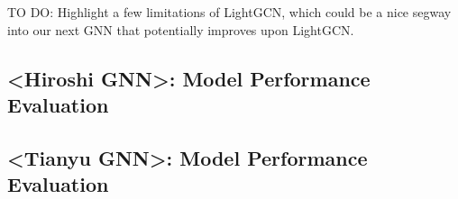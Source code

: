 \documentclass{article}
\begin{document}
 TO DO: Highlight a few limitations of LightGCN, which could be a nice segway into our next GNN that potentially improves upon LightGCN.





\subsection{<Hiroshi GNN>: Model Performance Evaluation}

\subsection{<Tianyu GNN>: Model Performance Evaluation}





\end{document}
